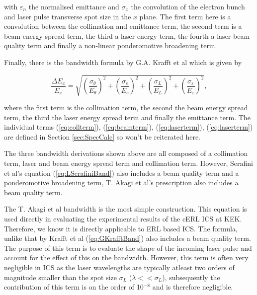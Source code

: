 \documentclass[11pt]{article}
\begin{document}
\noindent with $\varepsilon_{n}$ the normalised emittance and $\sigma_{x}$ the convolution of the electron bunch and laser pulse transverse spot size in the $x$ plane. The first term here is a convolution between the collimation and emittance term, the second term is a beam energy spread term, the third a laser energy term, the fourth a laser beam quality term and finally a non-linear ponderomotive broadening term.

Finally, there is the bandwidth formula by G.A. Krafft et al which is given by

\begin{equation}
\frac{\Delta E_{x}}{E_{x}} = \sqrt{\left(\frac{\sigma_{\theta}}{E_{\theta}}\right)^{2}+\left(\frac{\sigma_{e}}{E_{e}}\right)^{2}+\left(\frac{\sigma_{L}}{E_{L}}\right)^{2}+\left(\frac{\sigma_{\varepsilon}}{E_{\varepsilon}}\right)^{2}},
\label{eq:GKrafftBand}
\end{equation}

\noindent where the first term is the collimation term, the second the beam energy spread term, the third the laser energy spread term and finally the emittance term. The individual terms (\ref{eq:collterm}),  (\ref{eq:beamterm}), (\ref{eq:laserterm}), (\ref{eq:laserterm}) are defined in Section \ref{sec:SpecCalc} so won't be reiterated here.

\vspace{5mm}

The three bandwidth derivations shown above are all composed of a collimation term, laser and beam energy spread term and collimation term. However, Serafini et al's equation (\ref{eq:LSerafiniBand}) also includes a beam quality term and a ponderomotive broadening term, T. Akagi et al's prescription also includes a beam quality term.  

The T. Akagi et al \cite{TAkagicERL} bandwidth is the most simple construction. This equation is used directly in evaluating the experimental results of the cERL ICS at KEK. Therefore, we know it is directly applicable to ERL based ICS. The formula, unlike that by Krafft et al (\ref{eq:GKrafftBand}) also includes a beam quality term. The purpose of this term is to evaluate the shape of the incoming laser pulse and account for the effect of this on the bandwidth. However, this term is often very negligible in ICS as the laser wavelengths are typically atleast two orders of magnitude smaller than the spot size $\sigma_{L}$ ($\lambda << \sigma_{L}$), subsequently the contribution of this term is on the order of 10$^{-8}$ and is therefore negligible. 
\end{document}
